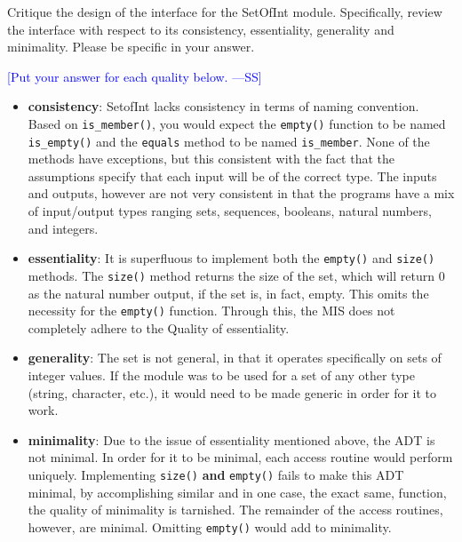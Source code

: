 \documentclass[12pt,fleqn]{examtst}
\newcommand{\authornote}[3]{\textcolor{#1}{[#3 ---#2]}}
\newcommand{\authornote}[3]{}
\newcommand{\wss}[1]{\authornote{blue}{SS}{#1}}
\begin{document}
\noindent
\begin{minipage}{\textwidth}

Critique the design of the interface for the SetOfInt module.  Specifically,
review the interface with respect to its consistency, essentiality, generality
and minimality.  Please be specific in your answer.

\wss{Put your answer for each quality below.}


\begin{itemize}
\item \textbf{consistency}: SetofInt lacks consistency in terms of naming convention. Based on \verb|is_member()|, you would expect the \verb|empty()| function to be named \verb|is_empty()| and the \verb|equals| method to be named \verb|is_member|. None of the methods have exceptions, but this consistent with the fact that the assumptions specify that each input will be of the correct type. The inputs and outputs, however are not very consistent in that the programs have a mix of input/output types ranging sets, sequences, booleans, natural numbers, and integers.
\item \textbf{essentiality}: It is superfluous to implement both the \verb|empty()| and \verb|size()| methods. The \verb|size()| method returns the size of the set, which will return 0 as the natural number output, if the set is, in fact, empty. This omits the necessity for the \verb|empty()| function. Through this, the MIS does not completely adhere to the Quality of essentiality. 
\item \textbf{generality}: The set is not general, in that it operates specifically on sets of integer values. If the module was to be used for a set of any other type (string, character, etc.), it would need to be made generic in order for it to work. 
\item \textbf{minimality}: Due to the issue of essentiality mentioned above, the ADT is not minimal. In order for it to be minimal, each access routine would perform uniquely. Implementing \verb|size()| \textbf{and} \verb|empty()| fails to make this ADT minimal, by accomplishing similar and in one case, the exact same, function, the quality of minimality is tarnished. The remainder of the access routines, however, are minimal. Omitting \verb|empty()| would add to minimality.
\end{itemize}

\end{minipage}

\end{document}

